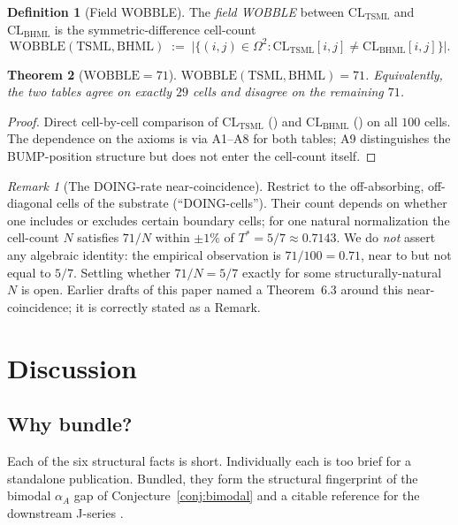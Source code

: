 \documentclass[11pt,reqno]{amsart}
\theoremstyle{plain}
\newtheorem{theorem}{Theorem}[section]
\theoremstyle{definition}
\newtheorem{definition}[theorem]{Definition}
\theoremstyle{remark}
\newtheorem*{remark}{Remark}
\newcommand{\TSML}{\mathrm{TSML}}
\newcommand{\BHML}{\mathrm{BHML}}
\begin{document}
\begin{definition}[Field WOBBLE]\label{def:wobble}
The \emph{field WOBBLE} between $\mathrm{CL}_\TSML$ and
$\mathrm{CL}_\BHML$ is the symmetric-difference cell-count
\[
\mathrm{WOBBLE}(\TSML, \BHML)
\;:=\; \bigl|\{(i, j) \in \Omega^2 : \mathrm{CL}_\TSML[i,j]
\neq \mathrm{CL}_\BHML[i,j]\}\bigr|.
\]
\end{definition}

\begin{theorem}[$\mathrm{WOBBLE} = 71$]\label{thm:wobble}
$\mathrm{WOBBLE}(\TSML, \BHML) = 71$. Equivalently, the two tables
agree on exactly $29$ cells and disagree on the remaining $71$.
\end{theorem}

\begin{proof}
Direct cell-by-cell comparison of $\mathrm{CL}_\TSML$ (\cite[\S2]{SandersForcing})
and $\mathrm{CL}_\BHML$ (\cite[\S2.2]{SandersGishSO10}) on all $100$
cells. The dependence on the axioms is via A1--A8 for both tables;
A9 distinguishes the BUMP-position structure but does not enter the
cell-count itself.
\end{proof}

\begin{remark}[The DOING-rate near-coincidence]
\label{rem:doing-rate}
Restrict to the off-absorbing, off-diagonal cells of the substrate
(``DOING-cells''). Their count depends on whether one includes or
excludes certain boundary cells; for one natural normalization the
cell-count $N$ satisfies $71/N$ within $\pm 1\%$ of $T^* = 5/7
\approx 0.7143$. We do \emph{not} assert any algebraic identity:
the empirical observation is $71/100 = 0.71$, near to but not equal
to $5/7$. Settling whether $71/N = 5/7$ exactly for some
structurally-natural $N$ is open. Earlier drafts of this paper
named a Theorem~6.3 around this near-coincidence; it is correctly
stated as a Remark.
\end{remark}

\section{Discussion}\label{sec:disc}

\subsection{Why bundle?}
Each of the six structural facts is short. Individually each is too
brief for a standalone publication. Bundled, they form the structural
fingerprint of the bimodal $\alpha_A$ gap of
Conjecture~\ref{conj:bimodal} and a citable reference for the
downstream J-series \cite{SandersGishSO8,SandersGishSO10,SandersGishFourCore}.
\end{document}
